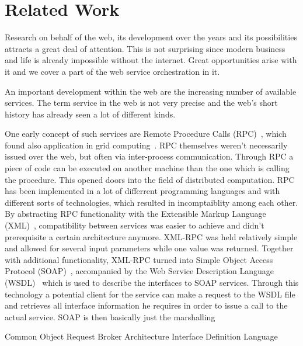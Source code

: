 
\chapter{Related Work}

Research on behalf of the web, its development over the years and its possibilities attracts a great deal of attention.
This is not surprising since modern business and life is already impossible without the internet.
Great opportunities arise with it and we cover a part of the web service orchestration in it.

An important development within the web are the increasing number of available services.
The term service in the web is not very precise and the web's short history has already seen a lot of different kinds.

One early concept of such services are Remote Procedure Calls (RPC)~\cite{Birrell:1984:IRP:2080.357392}, which found also application in grid computing~\cite{seymour2002overview}.
RPC themselves weren't necessarily issued over the web, but often via inter-process communication.
Through RPC a piece of code can be executed on another machine than the one which is calling the procedure.
This opened doors into the field of distributed computation.
RPC has been implemented in a lot of differrent programming languages and with different sorts of technologies, which resulted in incomptaiblity among each other.
By abstracting RPC functionality with the Extensible Markup Language (XML)~\cite{bray1998extensible}, compatibility between services was easier to achieve and didn't prerequisite a certain architecture anymore.
XML-RPC was held relatively simple and allowed for several input parameters while one value was returned.
Together with additional functionality, XML-RPC turned into Simple Object Access Protocol (SOAP)~\cite{box2000simple}, accompanied by the Web Service Description Language (WSDL)~\cite{christensen2001web} which is used to describe the interfaces to SOAP services.
Through this technology a potential client for the service can make a request to the WSDL file and retrieves all interface information he requires in order to issue a call to the actual service.
SOAP is then basically just the marshalling 

Common Object Request Broker Architecture
Interface Definition Language






